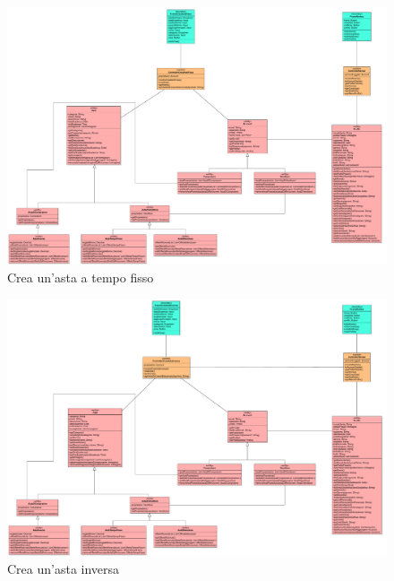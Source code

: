             \begin{figure}[htbp!]
                \centering
                    \includegraphics[width=1\linewidth]{Immagini/Diagrammi/Class Diagram/Venditore e compratore/CreaAstaFissa.pdf}
                \caption{Crea un'asta a tempo fisso}
            \end{figure}
            
            \begin{figure}[htbp!]
                \centering
                    \includegraphics[width=1\linewidth]{Immagini/Diagrammi/Class Diagram/Venditore e compratore/CreaAstaInversa.pdf}
                \caption{Crea un'asta inversa}
            \end{figure}
            
